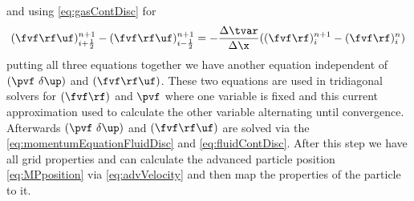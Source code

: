 and using \eqref{eq:gasContDisc} for
\begin{align*}
    (\fvf \rf \uf)_{i+\frac{1}{2}}^{n+1} - (\fvf \rf \uf)_{i-\frac{1}{2}}^{n+1} = - \dfrac{\Delta \tvar}{\Delta \x} ((\fvf \rf)_i^{n+1} - (\fvf \rf)_{i}^n)
\end{align*}
putting all three equations together we have another equation independent of $(\pvf \ \delta \up)$ and $(\fvf \rf \uf)$.
\color{black}
These two equations are used in tridiagonal solvers for $(\fvf \rf)$ and $\pvf$ where one variable is fixed and this current approximation used to calculate the other variable alternating until convergence.
Afterwards $(\pvf \ \delta \up)$ and $(\fvf \rf \uf)$ are solved via the \eqref{eq:momentumEquationFluidDisc} and \eqref{eq:fluidContDisc}.
After this step we have all grid properties and can calculate the advanced particle position \eqref{eq:MPposition} via \eqref{eq:advVelocity} and then map the properties of the particle to it. 

